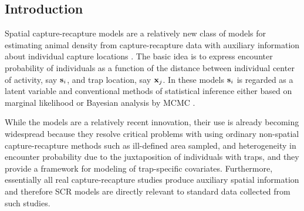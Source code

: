 \documentclass[12pt]{article}
\begin{document}
\begin{spacing}{1.8}

\section{Introduction}


Spatial capture-recapture models are a relatively new class of models
for estimating animal density from capture-recapture data with
auxiliary information about individual capture locations
\citep{efford:2004,borchers_efford:2008, royle_young:2008, efford_etal:2009,
  royle_etal:2009ecol}.
The basic idea is to express encounter probability of
individuals as a function of the distance between individual center of
activity, say ${\bf s}_{i}$, and trap location, say ${\bf x}_{j}$.  
In these models ${\bf s}_{i}$ is regarded as a latent variable and
conventional methods of statistical inference either based on marginal
likelihood \citep{borchers_efford:2008} or Bayesian analysis by MCMC
\citep{royle_young:2008}.

While the models are a relatively recent innovation, their use is
already becoming widespread \citep{efford_etal:2009,
  gardner_etal:2010jwm, gardner_etal:2010ecol,kery_etal:2010, 
  gopalaswamy_etal:2012, foster_harmsen:2012} because they resolve
critical problems with using ordinary non-spatial capture-recapture
methods such as ill-defined area sampled, and heterogeneity in
encounter probability due to the juxtaposition of individuals with
traps, and they provide a framework for modeling of trap-specific
covariates.  Furthermore, essentially all real capture-recapture
studies produce auxiliary spatial information and therefore SCR models
are directly relevant to standard data collected from such studies.


\end{spacing}
\end{document}
